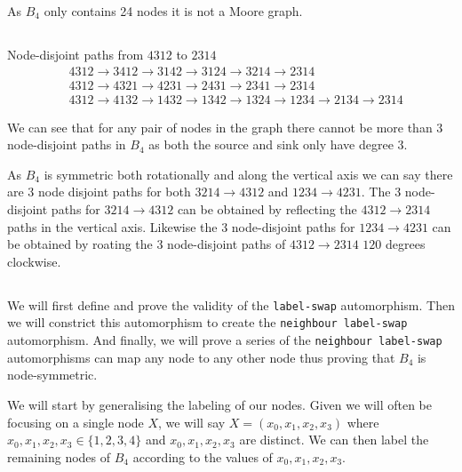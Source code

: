 As $B_4$ only contains 24 nodes it is not a Moore graph.

\subsection{}
Node-disjoint paths from $4312$ to $2314$
\begin{align*}
    &4312 \rightarrow 3412 \rightarrow 3142 \rightarrow 3124 \rightarrow 3214 \rightarrow 2314 \\
    &4312 \rightarrow 4321 \rightarrow 4231 \rightarrow 2431 \rightarrow 2341 \rightarrow 2314\\
    &4312 \rightarrow 4132 \rightarrow 1432 \rightarrow 1342 \rightarrow 1324 \rightarrow 1234 \rightarrow 2134 \rightarrow 2314
\end{align*}

We can see that for any pair of nodes in the graph there cannot be more than 3 node-disjoint paths in $B_4$ as both the source and sink only have degree 3. 

As $B_4$ is symmetric both rotationally and along the vertical axis we can say there are 3 node disjoint paths for both $3214 \rightarrow 4312$ and $1234 \rightarrow 4231$.
The 3 node-disjoint paths for $3214 \rightarrow 4312$ can be obtained by reflecting the $4312\rightarrow 2314$ paths in the vertical axis.
Likewise the 3 node-disjoint paths for $1234 \rightarrow 4231$ can be obtained by roating the 3 node-disjoint paths of $4312\rightarrow 2314$ $120$ degrees clockwise. 

\subsection{}

\newcommand{\ls}{\texttt{label-swap}\xspace}
We will first define and prove the validity of the \ls automorphism.
Then we will constrict this automorphism to create the \texttt{neighbour label-swap} automorphism.
And finally, we will prove a series of the \texttt{neighbour label-swap} automorphisms can map any node to any other node thus proving that $B_4$ is node-symmetric.

We will start by generalising the labeling of our nodes.
Given we will often be focusing on a single node $X$, we will say $X=(x_0, x_1, x_2, x_3)$ where $x_0,x_1,x_2,x_3\in\{1,2,3,4\}$ and $x_0, x_1, x_2, x_3$ are distinct.
We can then label the remaining nodes of $B_4$ according to the values of $x_0, x_1, x_2, x_3$.

